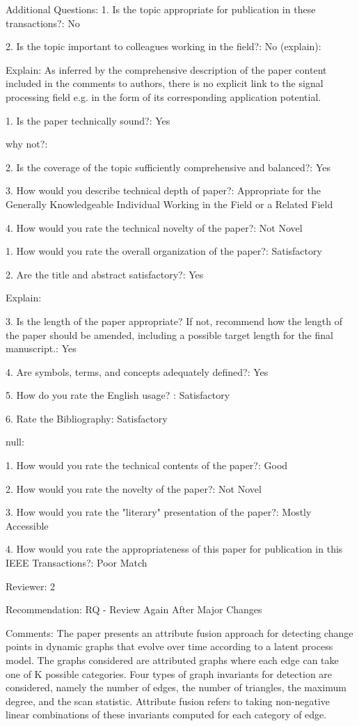 Additional Questions:
1. Is the topic appropriate for publication in these transactions?: No

2. Is the topic important to colleagues working in the field?: No (explain):

Explain: As inferred by the comprehensive description of the paper
content included in the comments to authors, there is no explicit link
to the signal processing field e.g. in the form of its corresponding
application potential.

1. Is the paper technically sound?: Yes

why not?: 

2. Is the coverage of the topic sufficiently comprehensive and balanced?: Yes

3. How would you describe technical depth of paper?: Appropriate for
the Generally Knowledgeable Individual Working in the Field or a
Related Field

4. How would you rate the technical novelty of the paper?: Not Novel

1. How would you rate the overall organization of the paper?: Satisfactory

2. Are the title and abstract satisfactory?: Yes

Explain: 

3. Is the length of the paper appropriate? If not, recommend how the
length of the paper should be amended, including a possible target
length for the final manuscript.: Yes

4. Are symbols, terms, and concepts adequately defined?: Yes

5. How do you rate the English usage? : Satisfactory

6. Rate the Bibliography: Satisfactory

null: 

1. How would you rate the technical contents of the paper?: Good

2. How would you rate the novelty of the paper?: Not Novel

3. How would you rate the "literary" presentation of the paper?: Mostly Accessible

4. How would you rate the appropriateness of this paper for
publication in this IEEE Transactions?: Poor Match


Reviewer: 2

Recommendation: RQ - Review Again After Major Changes

Comments:
The paper presents an attribute fusion approach for detecting change
points in dynamic graphs that evolve over time according to a latent
process model. The graphs considered are attributed graphs where each
edge can take one of K possible categories. Four types of graph
invariants for detection are considered, namely the number of edges,
the number of triangles, the maximum degree, and the scan statistic.
Attribute fusion refers to taking non-negative linear combinations of
these invariants computed for each category of edge.


